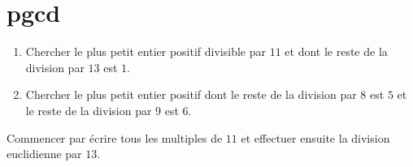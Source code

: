 \documentclass[11pt,class=report,crop=false]{standalone}
\begin{document}
    




\bigskip
\bigskip


\section{pgcd}

\exercice{}
\enonce
\sauteligne
 \begin{enumerate}
  \item Chercher le plus petit entier positif divisible par $11$ et dont le reste de la division par $13$ est $1$.
  
  \item Chercher le plus petit entier positif dont le reste de la division par $8$ est $5$ et le reste de la division par $9$ est $6$.
\end{enumerate} 
\finenonce

\indication
Commencer par écrire tous les multiples de $11$ et effectuer ensuite la division euclidienne par $13$.
\finindication
\end{document}
